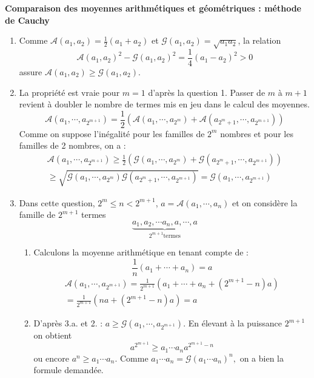 \textbf{Comparaison des moyennes arithmétiques et géométriques : méthode de Cauchy}
\begin{enumerate}
\item  Comme $\mathcal{A}(a_{1},a_{2})=\frac{1}{2}(a_{1}+a_{2})$ et $\mathcal{G}(a_{1},a_{2})=\sqrt{a_{1}a_{2}}$, la relation
\begin{displaymath}
\mathcal{A}(a_{1},a_{2})^{2}-\mathcal{G}(a_{1},a_{2})^{2}=\frac{1}{4}(a_{1}-a_{2})^{2}>0 
\end{displaymath}
assure $\mathcal{A}(a_{1},a_{2})\geq \mathcal{G}(a_{1},a_{2})$.

\item  La propriété est vraie pour $m=1$ d'après la question 1. Passer de $m$ à $m+1$ revient à doubler le nombre de termes mis en jeu dans le calcul des moyennes.
\begin{displaymath}\mathcal{A}(a_{1},\cdots ,a_{2^{m+1}})=\frac{1}{2}\left( \mathcal{A}(a_{1},\cdots ,a_{2^{m}}) + \mathcal{A}(a_{2^{m}+1},\cdots,a_{2^{m+1}})\right) 
\end{displaymath}
Comme on suppose l'inégalité pour les familles de $2^{m}$ nombres et pour les familles de 2 nombres, on a :
\begin{multline*}
\mathcal{A}(a_{1},\cdots ,a_{2^{m+1}}) \geq 
\frac{1}{2}\left( \mathcal{G}(a_{1},\cdots ,a_{2^{m}})+\mathcal{G}(a_{2^{m}+1},\cdots ,a_{2^{m+1}})\right)\\
\geq \sqrt{\mathcal{G}(a_{1},\cdots ,a_{2^{m}})\mathcal{G}(a_{2^{m}+1},\cdots ,a_{2^{m+1}})} 
= \mathcal{G}(a_{1},\cdots ,a_{2^{m+1}})
\end{multline*}

\item  Dans cette question, $2^{m}\leq n<2^{m+1}$, $a=\mathcal{A}(a_{1},\cdots ,a_{n})$ et on consid{\`e}re la famille de $2^{m+1}$ termes
\begin{displaymath}\underbrace{a_{1},a_{2},\cdots a_{n},a,\cdots ,a}_{{2^{m+1}\mathrm{termes}}}
\end{displaymath}

\begin{enumerate}
\item  Calculons la moyenne arithmétique en tenant compte de : 
\begin{displaymath}
 \frac{1}{n}(a_{1}+\cdots +a_{n})=a
\end{displaymath}
\begin{multline*}
\mathcal{A}(a_{1},\cdots ,a_{2^{m+1}})
= \frac{1}{2^{m+1}}\left( a_{1} + \cdots+a_{n} + (2^{m+1}-n)a\right) \\
= \frac{1}{2^{m+1}}\left( na+(2^{m+1}-n)a\right) = a
\end{multline*}
\item  D'apr{\`e}s 3.a. et 2. : $a\geq \mathcal{G}(a_{1},\cdots,a_{2^{m+1}})$. En élevant à la puissance $2^{m+1}$ on obtient
\begin{displaymath}a^{2^{m+1}}\geq a_{1}\cdots a_{n}a^{2^{m+1}-n} 
\end{displaymath}
ou encore $a^{n}\geq a_{1}\cdots a_{n}$. Comme $a_{1}\cdots a_{n}=\mathcal{G}(a_{1}\cdots a_{n})^{n},$ on a bien la formule demandée.
\end{enumerate}
\end{enumerate}
